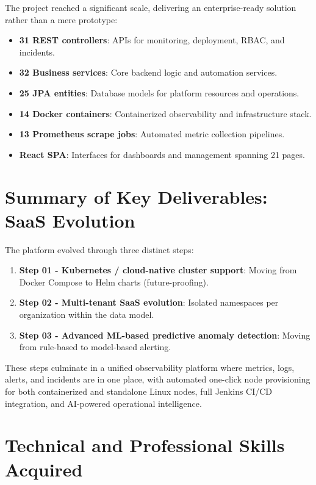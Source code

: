 \documentclass[12pt,a4paper]{report}
\begin{document}
The project reached a significant scale, delivering an enterprise-ready solution rather than a mere prototype:

\begin{itemize}
    \item \textbf{31 REST controllers}: APIs for monitoring, deployment, RBAC, and incidents.
    \item \textbf{32 Business services}: Core backend logic and automation services.
    \item \textbf{25 JPA entities}: Database models for platform resources and operations.
    \item \textbf{14 Docker containers}: Containerized observability and infrastructure stack.
    \item \textbf{13 Prometheus scrape jobs}: Automated metric collection pipelines.
    \item \textbf{React SPA}: Interfaces for dashboards and management spanning 21 pages.
\end{itemize}

\section{Summary of Key Deliverables: SaaS Evolution}

The platform evolved through three distinct steps:
\begin{enumerate}
    \item \textbf{Step 01 - Kubernetes / cloud-native cluster support}: Moving from Docker Compose to Helm charts (future-proofing).
    \item \textbf{Step 02 - Multi-tenant SaaS evolution}: Isolated namespaces per organization within the data model.
    \item \textbf{Step 03 - Advanced ML-based predictive anomaly detection}: Moving from rule-based to model-based alerting.
\end{enumerate}

These steps culminate in a unified observability platform where metrics, logs, alerts, and incidents are in one place, with automated one-click node provisioning for both containerized and standalone Linux nodes, full Jenkins CI/CD integration, and AI-powered operational intelligence.

\section{Technical and Professional Skills Acquired}
\end{document}
